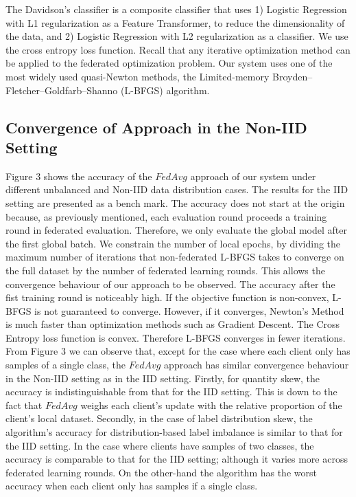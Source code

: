 \documentclass[letterpaper]{article} %
\begin{document}
The Davidson's classifier is a composite classifier that uses 1) Logistic Regression with L1 regularization as a Feature Transformer, to reduce the dimensionality of the data, and 2) Logistic Regression with L2 regularization as a classifier. We use the cross entropy loss function. Recall that any iterative optimization method can be applied to the federated optimization problem. Our system uses one of the most widely used quasi-Newton methods, the Limited-memory Broyden–Fletcher–Goldfarb–Shanno (L-BFGS) algorithm.

\subsection{Convergence of Approach in the Non-IID Setting}

Figure 3 shows the accuracy of the $FedAvg$ approach of our system under different unbalanced and Non-IID data distribution cases. The results for the IID setting are presented as a bench mark. The accuracy does not start at the origin because, as previously mentioned, each evaluation round proceeds a training round in federated evaluation. Therefore, we only evaluate the global model after the first global batch. We constrain the number of local epochs, by dividing the maximum number of iterations that non-federated L-BFGS takes to converge on the full dataset by the number of federated learning rounds. This allows the convergence behaviour of our approach to be observed. The accuracy after the fist training round is noticeably high. If the objective function is non-convex, L-BFGS is not guaranteed to converge. However, if it converges, Newton's Method is much faster than optimization methods such as Gradient Descent. The Cross Entropy loss function is convex. Therefore L-BFGS converges in fewer iterations. From Figure 3 we can observe that, except for the case where each client only has samples of a single class, the $FedAvg$ approach has similar convergence behaviour in the Non-IID setting as in the IID setting. Firstly, for quantity skew, the accuracy is indistinguishable from that for the IID setting. This is down to the fact that $FedAvg$ weighs each client's update with the relative proportion of the client's local dataset. Secondly, in the case of label distribution skew, the algorithm's accuracy for distribution-based label imbalance is similar to that for the IID setting. In the case where clients have samples of two classes, the accuracy is comparable to that for the IID setting; although it varies more across federated learning rounds. On the other-hand the algorithm has the worst accuracy when each client only has samples if a single class.
\end{document}
